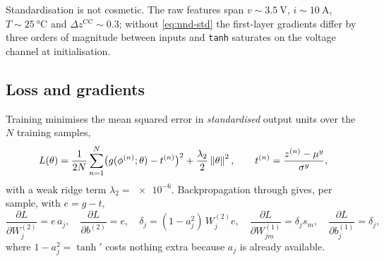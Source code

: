 Standardisation is not cosmetic.  The raw features span
$v\sim\SI{3.5}{\volt}$, $i\sim\SI{10}{\ampere}$, $T\sim\SI{25}{\celsius}$ and
$\Delta z^{\mathrm{CC}}\sim 0.3$; without \cref{eq:nnd-std} the first-layer gradients differ by
three orders of magnitude between inputs and \texttt{tanh} saturates on the voltage channel at
initialisation.

\subsection{Loss and gradients}
Training minimises the mean squared error in \emph{standardised} output units over the $N$
training samples,
\begin{equation}\label{eq:nnd-loss}
L(\theta) = \frac{1}{2N}\sum_{n=1}^{N}\bigl(g(\phi^{(n)};\theta) - t^{(n)}\bigr)^2
+ \frac{\lambda_2}{2}\left\lVert \theta \right\rVert^2,
\qquad t^{(n)} = \frac{z^{(n)} - \mu^y}{\sigma^y},
\end{equation}
with a weak ridge term $\lambda_2 = \num{e-6}$.  Backpropagation \citep{rumelhart1986backprop}
through  gives, per sample, with $e = g - t$,
\begin{equation}\label{eq:nnd-grad}
\frac{\partial L}{\partial W^{(2)}_j} = e\, a_j,\quad
\frac{\partial L}{\partial b^{(2)}} = e,\quad
\delta_j = (1 - a_j^2)\, W^{(2)}_j e,\quad
\frac{\partial L}{\partial W^{(1)}_{jm}} = \delta_j s_m,\quad
\frac{\partial L}{\partial b^{(1)}_j} = \delta_j ,
\end{equation}
where $1-a_j^2 = \tanh'$ costs nothing extra because $a_j$ is already available.

